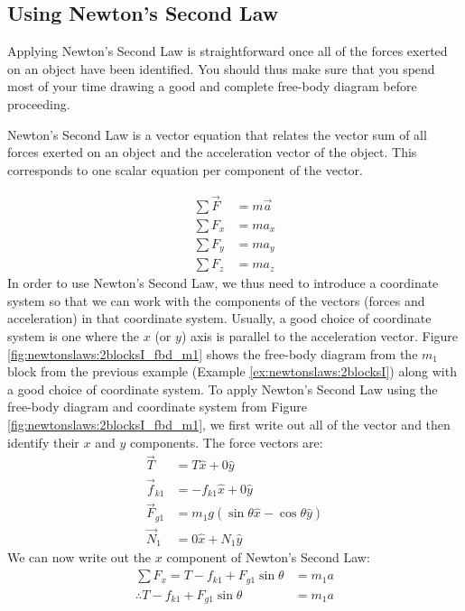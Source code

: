 \subsection{Using Newton's Second Law}
Applying Newton's Second Law is straightforward once all of the forces exerted on an object have been identified. You should thus make sure that you spend most of your time drawing a good and complete free-body diagram before proceeding.

Newton's Second Law is a vector equation that relates the vector sum of all forces exerted on an object and the acceleration vector of the object. This corresponds to one scalar equation per component of the vector.

\begin{align*}
\sum \vec F &=m\vec a\\
\sum F_x &= ma_x \\
\sum F_y &= ma_y \\
\sum F_z &= ma_z
\end{align*}
In order to use Newton's Second Law, we thus need to introduce a coordinate system so that we can work with the components of the vectors (forces and acceleration) in that coordinate system. Usually, a good choice of coordinate system is one where the $x$ (or $y$) axis is parallel to the acceleration vector. Figure \ref{fig:newtonslaws:2blocksI_fbd_m1} shows the free-body diagram from the $m_1$ block from the previous example (Example \ref{ex:newtonslaws:2blocksI}) along with a good choice of coordinate system. 
To apply Newton's Second Law using the free-body diagram and coordinate system from Figure \ref{fig:newtonslaws:2blocksI_fbd_m1}, we first write out all of the vector and then identify their $x$ and $y$ components. The force vectors are:
\begin{align*}
\vec T &= T\hat x+0\hat y\\
\vec f_{k1}&=-f_{k1}\hat x+0\hat y\\
\vec F_{g1}&=m_1g(\sin\theta \hat x-\cos\theta \hat y)\\
\vec N_1&=0\hat x+N_1\hat y
\end{align*}
We can now write out the $x$ component of Newton's Second Law:
\begin{align*}
\sum F_x = T-f_{k1}+F_{g1}\sin\theta &= m_1 a\\
\therefore T-f_{k1}+F_{g1}\sin\theta &= m_1 a
\end{align*}

